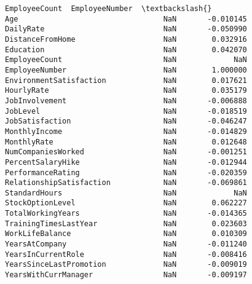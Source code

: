 \documentclass[11pt]{article}
\begin{document}
\begin{Verbatim}[commandchars=\\\{\}]
                          EmployeeCount  EmployeeNumber  \textbackslash{}
Age                                 NaN       -0.010145   
DailyRate                           NaN       -0.050990   
DistanceFromHome                    NaN        0.032916   
Education                           NaN        0.042070   
EmployeeCount                       NaN             NaN   
EmployeeNumber                      NaN        1.000000   
EnvironmentSatisfaction             NaN        0.017621   
HourlyRate                          NaN        0.035179   
JobInvolvement                      NaN       -0.006888   
JobLevel                            NaN       -0.018519   
JobSatisfaction                     NaN       -0.046247   
MonthlyIncome                       NaN       -0.014829   
MonthlyRate                         NaN        0.012648   
NumCompaniesWorked                  NaN       -0.001251   
PercentSalaryHike                   NaN       -0.012944   
PerformanceRating                   NaN       -0.020359   
RelationshipSatisfaction            NaN       -0.069861   
StandardHours                       NaN             NaN   
StockOptionLevel                    NaN        0.062227   
TotalWorkingYears                   NaN       -0.014365   
TrainingTimesLastYear               NaN        0.023603   
WorkLifeBalance                     NaN        0.010309   
YearsAtCompany                      NaN       -0.011240   
YearsInCurrentRole                  NaN       -0.008416   
YearsSinceLastPromotion             NaN       -0.009019   
YearsWithCurrManager                NaN       -0.009197   


\end{Verbatim}
\end{document}
